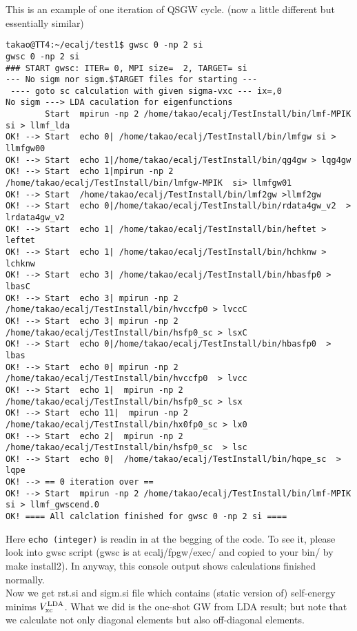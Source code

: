 \documentclass[a4paper,10pt,epsf,fleqn]{article}
\begin{document}
This is an example of one iteration of QSGW cycle.
(now a little different but essentially similar)
\begin{verbatim}
takao@TT4:~/ecalj/test1$ gwsc 0 -np 2 si
gwsc 0 -np 2 si
### START gwsc: ITER= 0, MPI size=  2, TARGET= si
--- No sigm nor sigm.$TARGET files for starting ---
 ---- goto sc calculation with given sigma-vxc --- ix=,0
No sigm ---> LDA caculation for eigenfunctions 
        Start  mpirun -np 2 /home/takao/ecalj/TestInstall/bin/lmf-MPIK  si > llmf_lda 
OK! --> Start  echo 0| /home/takao/ecalj/TestInstall/bin/lmfgw si > llmfgw00 
OK! --> Start  echo 1|/home/takao/ecalj/TestInstall/bin/qg4gw > lqg4gw 
OK! --> Start  echo 1|mpirun -np 2 /home/takao/ecalj/TestInstall/bin/lmfgw-MPIK  si> llmfgw01 
OK! --> Start  /home/takao/ecalj/TestInstall/bin/lmf2gw >llmf2gw
OK! --> Start  echo 0|/home/takao/ecalj/TestInstall/bin/rdata4gw_v2  > lrdata4gw_v2 
OK! --> Start  echo 1| /home/takao/ecalj/TestInstall/bin/heftet > leftet 
OK! --> Start  echo 1| /home/takao/ecalj/TestInstall/bin/hchknw > lchknw 
OK! --> Start  echo 3| /home/takao/ecalj/TestInstall/bin/hbasfp0 > lbasC 
OK! --> Start  echo 3| mpirun -np 2 /home/takao/ecalj/TestInstall/bin/hvccfp0 > lvccC 
OK! --> Start  echo 3| mpirun -np 2 /home/takao/ecalj/TestInstall/bin/hsfp0_sc > lsxC 
OK! --> Start  echo 0|/home/takao/ecalj/TestInstall/bin/hbasfp0  > lbas 
OK! --> Start  echo 0| mpirun -np 2 /home/takao/ecalj/TestInstall/bin/hvccfp0  > lvcc 
OK! --> Start  echo 1|  mpirun -np 2 /home/takao/ecalj/TestInstall/bin/hsfp0_sc > lsx 
OK! --> Start  echo 11|  mpirun -np 2 /home/takao/ecalj/TestInstall/bin/hx0fp0_sc > lx0 
OK! --> Start  echo 2|  mpirun -np 2 /home/takao/ecalj/TestInstall/bin/hsfp0_sc  > lsc 
OK! --> Start  echo 0|  /home/takao/ecalj/TestInstall/bin/hqpe_sc  > lqpe 
OK! --> == 0 iteration over ==
OK! --> Start  mpirun -np 2 /home/takao/ecalj/TestInstall/bin/lmf-MPIK  si > llmf_gwscend.0 
OK! ==== All calclation finished for gwsc 0 -np 2 si ====
\end{verbatim}
Here \verb+echo (integer)+ is readin in at the begging of the code.
To see it, please look into gwsc script (gwsc is at
ecalj/fpgw/exec/ and copied to your bin/ by make install2). 
In anyway, this console output shows calculations finished normally.\\

Now we get rst.si and sigm.si file which contains (static version of) self-energy
minims $V_{\rm xc}^{\rm LDA}$.
What we did is the one-shot GW from LDA result; but note that we
calculate not only diagonal elements but also off-diagonal elements. 
\end{document}
